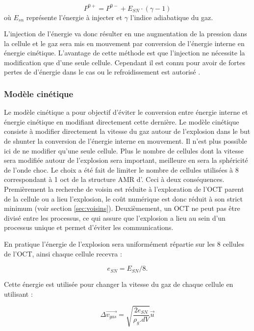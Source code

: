 \begin{equation}
P^{0+} = P^{0-}  + E_{SN} \cdot  (\gamma-1)
\end{equation}
où $E_{sn}$ représente l'énergie à injecter et $\gamma$ l'indice adiabatique du gaz.

L'injection de l'énergie va donc résulter en une augmentation de la pression dans la cellule et le gaz sera mis en mouvement par conversion de l'énergie interne en énergie cinétique. 
L'avantage de cette méthode est que l'injection ne nécessite la modification que d'une seule cellule.
Cependant il est connu pour avoir de fortes pertes de d'énergie dans le cas ou le refroidissement est autorisé \citep{navarro_simulations_1993}. 

\subsubsection{Modèle cinétique}

Le modèle cinétique a pour objectif d'éviter le conversion entre énergie interne et énergie cinétique en modifiant directement cette dernière.
Le modèle cinétique consiste à modifier directement la vitesse du gaz autour de l'explosion dans le but de shunter la conversion de l'énergie interne en mouvement.
Il n'est plus possible ici de ne modifier qu'une seule cellule.
Plus le nombre de cellules dont la vitesse sera modifiée autour de l'explosion sera important, meilleure en sera la sphéricité de l'onde choc.
Le choix a été fait de limiter le nombre de cellules utilisées à 8 correspondant à 1 oct de la structure \ac{AMR} d'\emma .
Ceci à deux conséquences.
Premièrement la recherche de voisin est réduite à l'exploration de l'OCT parent de la cellule ou a lieu l'explosion, le coût numérique est donc réduit à son strict minimum (voir section \ref{sec:voisins}).
Deuxièmement, un OCT ne peut pas être divisé entre les processus, ce qui assure que l'explosion a lieu au sein d'un processus unique et permet d'éviter les communications.

En pratique l'énergie de l'explosion sera uniformément répartie sur les 8 cellules de l'OCT, ainsi chaque cellule recevra : 

\begin{equation}
e_{SN} = E_{SN}/8.
\end{equation}

Cette énergie est utilisée pour changer la vitesse du gaz de chaque cellule en utilisant : 

\begin{equation}
    \Delta \overrightarrow{v_{gas}} = \sqrt{\frac{2e_{SN}}{\rho_g.dV}} \overrightarrow{u}
    \label{eq_sn_direct}
\end{equation}

